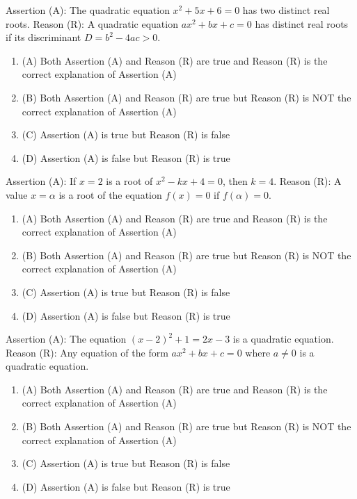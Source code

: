 \documentclass[12pt,a4paper]{exam}
\begin{document}
\begin{questions}
\question[1] Assertion (A): The quadratic equation $x^2 + 5x + 6 = 0$ has two distinct real roots. Reason (R): A quadratic equation $ax^2 + bx + c = 0$ has distinct real roots if its discriminant $D = b^2 - 4ac > 0$.
\begin{enumerate}[label=(\Alph*)]
  \item (A) Both Assertion (A) and Reason (R) are true and Reason (R) is the correct explanation of Assertion (A)
  \item (B) Both Assertion (A) and Reason (R) are true but Reason (R) is NOT the correct explanation of Assertion (A)
  \item (C) Assertion (A) is true but Reason (R) is false
  \item (D) Assertion (A) is false but Reason (R) is true
\end{enumerate}
\vspace{0.15cm}

\question[1] Assertion (A): If $x = 2$ is a root of $x^2 - kx + 4 = 0$, then $k = 4$. Reason (R): A value $x = \alpha$ is a root of the equation $f(x) = 0$ if $f(\alpha) = 0$.
\begin{enumerate}[label=(\Alph*)]
  \item (A) Both Assertion (A) and Reason (R) are true and Reason (R) is the correct explanation of Assertion (A)
  \item (B) Both Assertion (A) and Reason (R) are true but Reason (R) is NOT the correct explanation of Assertion (A)
  \item (C) Assertion (A) is true but Reason (R) is false
  \item (D) Assertion (A) is false but Reason (R) is true
\end{enumerate}
\vspace{0.15cm}

\question[1] Assertion (A): The equation $(x-2)^2 + 1 = 2x - 3$ is a quadratic equation. Reason (R): Any equation of the form $ax^2 + bx + c = 0$ where $a \neq 0$ is a quadratic equation.
\begin{enumerate}[label=(\Alph*)]
  \item (A) Both Assertion (A) and Reason (R) are true and Reason (R) is the correct explanation of Assertion (A)
  \item (B) Both Assertion (A) and Reason (R) are true but Reason (R) is NOT the correct explanation of Assertion (A)
  \item (C) Assertion (A) is true but Reason (R) is false
  \item (D) Assertion (A) is false but Reason (R) is true
\end{enumerate}
\vspace{0.15cm}


\end{questions}
\end{document}
